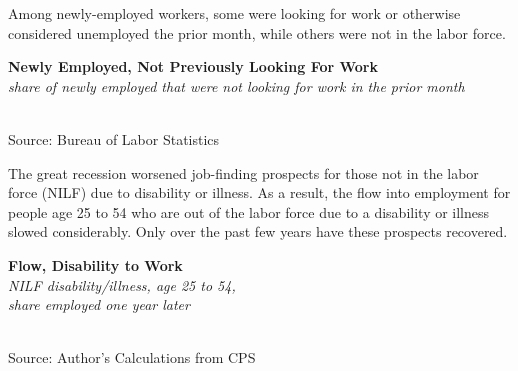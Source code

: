 \documentclass{report}
\makeatletter
\newcommand{\tbllink}[1]{\href{https://raw.githubusercontent.com/bdecon/US-chartbook/master/chartbook/data/#1}{\faTable}}
\newcommand*\short[1]{\expandafter\@gobbletwo\number\numexpr#1\relax}
\newcommand{\dateaxisticks}{
		date coordinates in=x, axis line style={draw=none},
		xmax={2021-05-15},
		max space between ticks=40,	    
		xtick={{1990-01-01}, {1992-01-01}, {1994-01-01}, 
			{1996-01-01}, {1998-01-01}, {2000-01-01}, 
			{2002-01-01}, {2004-01-01}, {2006-01-01},
			{2008-01-01}, {2010-01-01}, {2012-01-01}, {2014-01-01},
		    {2016-01-01}, {2018-01-01}, {2020-01-01}},
		minor xtick={{1989-01-01}, {1991-01-01}, {1993-01-01},
			{1995-01-01}, {1997-01-01}, {1999-01-01}, 
			{2001-01-01}, {2003-01-01}, {2005-01-01}, {2007-01-01},
		    {2009-01-01}, {2011-01-01}, {2013-01-01}, {2015-01-01},
		    {2017-01-01}, {2019-01-01}, {2021-01-01}},
		enlarge y limits={0.06}, enlarge x limits={0.01},
		}
\newcommand{\shdateaxisticks}{
		date coordinates in=x, axis line style={draw=none},
		xmax={2021-05-15},
		max space between ticks=40,	    
		xtick={{1990-01-01}, {1995-01-01}, {2000-01-01}, 
			{2005-01-01}, {2010-01-01}, {2015-01-01}, {2020-01-01}},
		minor xtick={},
		enlarge y limits={0.06}, enlarge x limits={0.01},
		}
\newcommand{\bbar}[2]{extra #1 ticks = {{#2}}, extra #1 tick labels = ,
		extra #1 tick style = {grid=major, grid style={thick, black!25}},}
\newcommand{\stdline}[4]{\addplot[very thick, no markers, color=#1] 
		table [x=#2, y=#3, col sep=comma] {#4};	}
\newcommand{\rbars}{
		\fill[color=black!10] (axis cs:{1990-07-01},\pgfkeysvalueof{/pgfplots/ymin}) rectangle 
			(axis cs:{1991-03-01}, \pgfkeysvalueof{/pgfplots/ymax});
		\fill[color=black!10] (axis cs:{2007-12-01},\pgfkeysvalueof{/pgfplots/ymin}) rectangle 
			(axis cs:{2009-07-01}, \pgfkeysvalueof{/pgfplots/ymax});
		\fill[color=black!10] (axis cs:{2001-03-01},\pgfkeysvalueof{/pgfplots/ymin}) rectangle 
			(axis cs:{2001-11-01}, \pgfkeysvalueof{/pgfplots/ymax});
		\fill[color=black!10] (axis cs:{2020-02-01},\pgfkeysvalueof{/pgfplots/ymin}) rectangle 
			(axis cs:{2021-05-15}, \pgfkeysvalueof{/pgfplots/ymax});}
\newcommand{\rebars}{
		\fill[color=black!10] (axis cs:{2007-12-01},\pgfkeysvalueof{/pgfplots/ymin}) rectangle 
			(axis cs:{2009-07-01}, \pgfkeysvalueof{/pgfplots/ymax});
		\fill[color=black!10] (axis cs:{2001-03-01},\pgfkeysvalueof{/pgfplots/ymin}) rectangle 
			(axis cs:{2001-11-01}, \pgfkeysvalueof{/pgfplots/ymax});
		\fill[color=black!10] (axis cs:{2020-02-01},\pgfkeysvalueof{/pgfplots/ymin}) rectangle 
			(axis cs:{2021-05-15}, \pgfkeysvalueof{/pgfplots/ymax});}
\makeatother
\begin{document}
{{\begin{minipage}{0.76\textwidth}
Among newly-employed workers, some were looking for work or otherwise considered unemployed the prior month, while others were not in the labor force.  
\vspace{2mm}

\normalsize \textbf{Newly Employed, Not Previously Looking For Work}\\
\footnotesize{\textit{share of newly employed that were not looking for work in the prior month}}\\
\hspace*{-2mm} \\
\footnotesize{Source: Bureau of Labor Statistics} \hfill \tbllink{lf_flow.csv} \ \tbllink{lf_flow_q.csv}
\end{minipage}
\vspace{3mm}

\begin{minipage}{0.32\textwidth}
\small The great recession worsened job-finding prospects for those not in the labor force (NILF) due to disability or illness. As a result, the flow into employment for people age 25 to 54 who are out of the labor force due to a disability or illness slowed considerably. Only over the past few years have these prospects recovered. 
\end{minipage} \hspace{5mm} \begin{minipage}{0.4\textwidth}
\normalsize \textbf{Flow, Disability to Work}\\
\footnotesize{\textit{NILF disability/illness, age 25 to 54,}}\\
\footnotesize{\textit{share employed one year later}}\\
\hspace*{-2mm} \\
\footnotesize{Source: Author's Calculations from CPS} \hfill \tbllink{disflow.csv}
\end{minipage}
\newpage
\begin{minipage}{0.76\textwidth}

\end{minipage}}}
\end{document}
